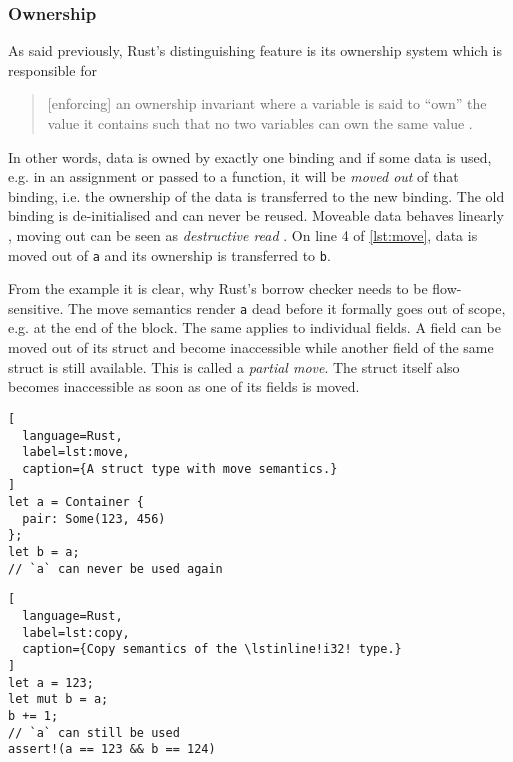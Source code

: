 \subsubsection{Ownership}

As said previously, Rust's distinguishing feature is its ownership system which
is responsible for

\begin{quote}
{[enforcing]} an ownership invariant where a
variable is said to ``own'' the value it contains such that no two variables can
own the same value \cite[page 5]{lightweight-formalism}.
\end{quote}

In other words, data is owned by exactly one binding and if some data is used,
e.g. in an assignment or passed to a function, it will be \emph{moved out} of
that binding, i.e. the ownership of the data is transferred to the new binding.
The old binding is de-initialised and can never be reused. Moveable data behaves
linearly \cite{oxide}, moving out can be seen as \emph{destructive read}
\cite{islands-alias-protection}. On line 4 of \autoref{lst:move}, data is moved
out of \lstinline!a! and its ownership is transferred to \lstinline!b!.

From the example it is clear, why Rust's borrow checker needs to be
flow-sensitive. The move semantics render \lstinline!a! dead before it formally
goes out of scope, e.g. at the end of the block. The same applies to individual
fields. A field can be moved out of its struct and become inaccessible while
another field of the same struct is still available. This is called a
\emph{partial move}. The struct itself also becomes inaccessible as soon as one
of its fields is moved.

\noindent\begin{minipage}[t]{.48\textwidth}
\begin{lstlisting}[
  language=Rust,
  label=lst:move,
  caption={A struct type with move semantics.}
]
let a = Container {
  pair: Some(123, 456)
};
let b = a;
// `a` can never be used again
\end{lstlisting}
\end{minipage}\hfill
\begin{minipage}[t]{.48\textwidth}
\begin{lstlisting}[
  language=Rust,
  label=lst:copy,
  caption={Copy semantics of the \lstinline!i32! type.}
]
let a = 123;
let mut b = a;
b += 1;
// `a` can still be used
assert!(a == 123 && b == 124)
\end{lstlisting}
\end{minipage}

